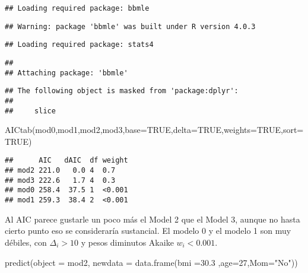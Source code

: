 \documentclass[
]{book}
\newenvironment{Shaded}{\begin{snugshade}}{\end{snugshade}}
\newcommand{\AttributeTok}[1]{\textcolor[rgb]{0.77,0.63,0.00}{#1}}
\newcommand{\ConstantTok}[1]{\textcolor[rgb]{0.00,0.00,0.00}{#1}}
\newcommand{\DecValTok}[1]{\textcolor[rgb]{0.00,0.00,0.81}{#1}}
\newcommand{\FloatTok}[1]{\textcolor[rgb]{0.00,0.00,0.81}{#1}}
\newcommand{\FunctionTok}[1]{\textcolor[rgb]{0.00,0.00,0.00}{#1}}
\newcommand{\NormalTok}[1]{#1}
\newcommand{\StringTok}[1]{\textcolor[rgb]{0.31,0.60,0.02}{#1}}
\begin{document}
\begin{verbatim}
## Loading required package: bbmle
\end{verbatim}

\begin{verbatim}
## Warning: package 'bbmle' was built under R version 4.0.3
\end{verbatim}

\begin{verbatim}
## Loading required package: stats4
\end{verbatim}

\begin{verbatim}
## 
## Attaching package: 'bbmle'
\end{verbatim}

\begin{verbatim}
## The following object is masked from 'package:dplyr':
## 
##     slice
\end{verbatim}

\begin{Shaded}
\begin{Highlighting}[]
\FunctionTok{AICtab}\NormalTok{(mod0,mod1,mod2,mod3,}\AttributeTok{base=}\ConstantTok{TRUE}\NormalTok{,}\AttributeTok{delta=}\ConstantTok{TRUE}\NormalTok{,}\AttributeTok{weights=}\ConstantTok{TRUE}\NormalTok{,}\AttributeTok{sort=}\ConstantTok{TRUE}\NormalTok{)}
\end{Highlighting}
\end{Shaded}

\begin{verbatim}
##      AIC   dAIC  df weight
## mod2 221.0   0.0 4  0.7   
## mod3 222.6   1.7 4  0.3   
## mod0 258.4  37.5 1  <0.001
## mod1 259.3  38.4 2  <0.001
\end{verbatim}

Al AIC parece gustarle un poco más el Model 2 que el Model 3, aunque no hasta cierto punto
eso se consideraría sustancial. El modelo 0 y el modelo 1 son muy débiles, con \(\Delta_i>10\) y pesos diminutos Akaike \(w_i<0.001\).

\begin{Shaded}
\begin{Highlighting}[]
\FunctionTok{predict}\NormalTok{(}\AttributeTok{object =}\NormalTok{ mod2, }\AttributeTok{newdata =} \FunctionTok{data.frame}\NormalTok{(}\AttributeTok{bmi =}\FloatTok{30.3}\NormalTok{ ,}\AttributeTok{age=}\DecValTok{27}\NormalTok{,}\AttributeTok{Mom=}\StringTok{"No"}\NormalTok{))}
\end{Highlighting}
\end{Shaded}
\end{document}
